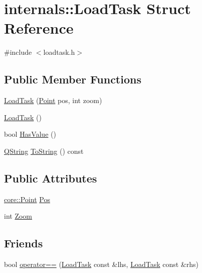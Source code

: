 \hypertarget{structinternals_1_1_load_task}{\section{internals\-:\-:\-Load\-Task \-Struct \-Reference}
\label{structinternals_1_1_load_task}
}


{\ttfamily \#include $<$loadtask.\-h$>$}

\subsection*{\-Public \-Member \-Functions}
\begin{DoxyCompactItemize}
\item 
\hyperlink{group___o_p_map_widget_gaef6bad3b01c5866351b69c90979f260e}{\-Load\-Task} (\hyperlink{structcore_1_1_point}{\-Point} pos, int zoom)
\item 
\hyperlink{group___o_p_map_widget_gab83d811cb8cb0cb08d8c56cad76df071}{\-Load\-Task} ()
\item 
bool \hyperlink{group___o_p_map_widget_ga158bba758e9847d68a36eb0efee84342}{\-Has\-Value} ()
\item 
\hyperlink{group___u_a_v_objects_plugin_gab9d252f49c333c94a72f97ce3105a32d}{\-Q\-String} \hyperlink{group___o_p_map_widget_gadf111b2f1982ddca99c4a295856c3968}{\-To\-String} () const 
\end{DoxyCompactItemize}
\subsection*{\-Public \-Attributes}
\begin{DoxyCompactItemize}
\item 
\hyperlink{structcore_1_1_point}{core\-::\-Point} \hyperlink{group___o_p_map_widget_gaaaf77679e16ef9213c85fbfaff467339}{\-Pos}
\item 
int \hyperlink{group___o_p_map_widget_gaee096bc3882220e2ed2b8b167cecb9ad}{\-Zoom}
\end{DoxyCompactItemize}
\subsection*{\-Friends}
\begin{DoxyCompactItemize}
\item 
bool \hyperlink{group___o_p_map_widget_ga6780adf9ff8340f912353a6ef6e68751}{operator==} (\hyperlink{structinternals_1_1_load_task}{\-Load\-Task} const \&lhs, \hyperlink{structinternals_1_1_load_task}{\-Load\-Task} const \&rhs)
\end{DoxyCompactItemize}


